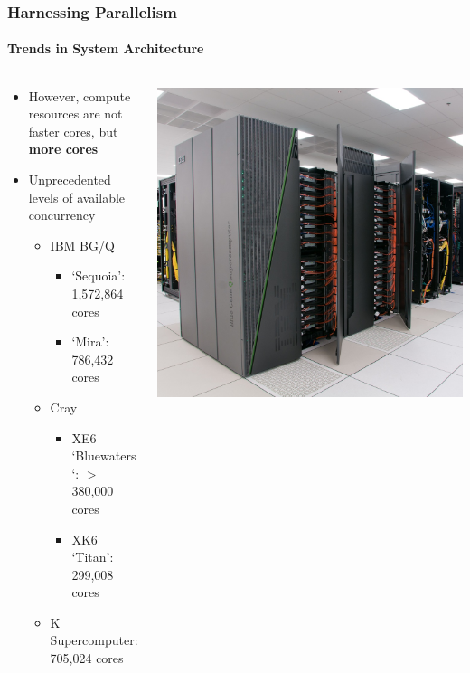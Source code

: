 \begin{frame}[shrink]
\frametitle{Harnessing Parallelism}
\framesubtitle{Trends in System Architecture}
  \begin{columns}
    \begin{column}{0.60\textwidth}
      \begin{itemize}
      \item However, compute resources are not faster cores, but \textbf{more cores}
      \item Unprecedented levels of available concurrency
        \begin{itemize}
        \item IBM BG/Q
          \begin{itemize}
          \item `Sequoia': 1,572,864 cores
          \item `Mira': 786,432 cores
          \end{itemize}
        \item Cray
          \begin{itemize}
          \item XE6 `Bluewaters`: $>$ 380,000 cores
          \item XK6 `Titan': 299,008 cores
          \end{itemize}
        \item K Supercomputer: 705,024 cores
        \end{itemize}
      \end{itemize}
    \end{column}
    \begin{column}{0.40\textwidth}
      \includegraphics[width=1\textwidth]{figures/mira.jpg}
    \end{column}
  \end{columns}


\end{frame}
